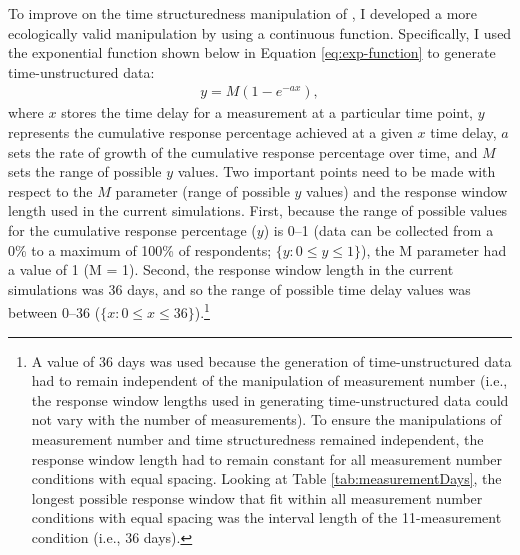 \documentclass[
12pt, %
twoside,
english]{guelphthesis}
\begin{document}
To improve on the time structuredness manipulation of \textcite{coulombe2016}, I developed a more ecologically valid manipulation by using a continuous function. Specifically, I used the exponential function shown below in Equation \ref{eq:exp-function} to generate time-unstructured data:
\begin{align}
y = M(1 - e^{-ax}),
\label{eq:exp-function} 
\end{align}
\noindent where \(x\) stores the time delay for a measurement at a particular time point, \(y\) represents the cumulative response percentage achieved at a given \(x\) time delay, \(a\) sets the rate of growth of the cumulative response percentage over time, and \(M\) sets the range of possible \(y\) values. Two important points need to be made with respect to the \(M\) parameter (range of possible \(y\) values) and the response window length used in the current simulations. First, because the range of possible values for the cumulative response percentage (\(y\)) is 0--1 (data can be collected from a 0\% to a maximum of 100\% of respondents; \(\{y : 0 \le y \le 1\}\)), the M parameter had a value of 1 (M = 1). Second, the response window length in the current simulations was 36 days, and so the range of possible time delay values was between 0--36 (\(\{x:0\le x \le36\}\)).\footnote{A value of 36 days was used because the generation of time-unstructured data had to remain independent of the manipulation of measurement number (i.e., the response window lengths used in generating time-unstructured data could not vary with the number of measurements). To ensure the manipulations of measurement number and time structuredness remained independent, the response window length had to remain constant for all measurement number conditions with equal spacing. Looking at Table \ref{tab:measurementDays}, the longest possible response window that fit within all measurement number conditions with equal spacing was the interval length of the 11-measurement condition (i.e., 36 days).}
\end{document}
